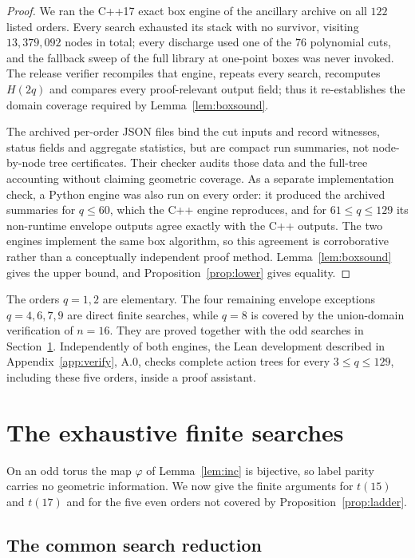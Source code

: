 \documentclass[11pt]{amsart}
\theoremstyle{definition}
\theoremstyle{remark}
\begin{document}
\begin{proof}
We ran the C++17 exact box engine of the ancillary archive on all $122$ listed orders.  Every
search exhausted its stack with no survivor, visiting $13{,}379{,}092$ nodes
in total; every discharge used one of the $76$ polynomial cuts, and the fallback
sweep of the full library at one-point boxes was never invoked.  The release verifier recompiles that engine, repeats every search,
recomputes $H(2q)$ and compares every proof-relevant output field; thus it
re-establishes the domain coverage required by Lemma~\ref{lem:boxsound}.

The archived per-order JSON files bind the cut inputs and record witnesses,
status fields and aggregate statistics, but are compact run summaries, not
node-by-node tree certificates.  Their checker audits those data and the
full-tree accounting without claiming geometric coverage.  As a separate
implementation check, a Python engine was also run on every order: it
produced the archived summaries for $q\le60$, which the C++ engine
reproduces, and for $61\le q\le129$ its non-runtime envelope outputs agree
exactly with the C++ outputs.  The two engines implement the same box
algorithm, so this agreement is corroborative rather than a conceptually
independent proof method.  Lemma~\ref{lem:boxsound}
gives the upper bound, and Proposition~\ref{prop:lower} gives equality.
\end{proof}

The orders $q=1,2$ are elementary.  The four remaining envelope exceptions
$q=4,6,7,9$ are direct finite searches, while $q=8$ is covered by the
union-domain verification of $n=16$.  They are proved together with the odd
searches in Section~\ref{sec:odd}.  Independently of both engines, the Lean
development described in Appendix~\ref{app:verify}, A.0, checks complete
action trees for every $3\le q\le129$, including these five orders, inside a
proof assistant.

\section{The exhaustive finite searches}\label{sec:odd}

On an odd torus the map $\varphi$ of Lemma~\ref{lem:inc} is bijective, so
label parity carries no geometric information.  We now give the finite
arguments for $t(15)$ and $t(17)$ and for the five even orders not covered by
Proposition~\ref{prop:ladder}.

\subsection{The common search reduction}\label{ssec:search}
\end{document}
